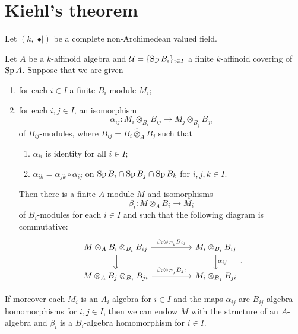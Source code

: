 \section{Kiehl's theorem}
Let $(k,|\bullet|)$ be a complete non-Archimedean valued field.
\begin{thm}\label{thm-Kiehl}
    Let $A$ be a $k$-affinoid algebra and $\mathcal{U}=\{\operatorname{Sp} B_i\}_{i\in I}$ a finite $k$-affinoid covering of $\operatorname{Sp} A$. Suppose that we are given 
    \begin{enumerate}
        \item for each $i\in I$ a finite $B_i$-module $M_i$;
        \item for each $i,j\in I$, an isomorphism 
        \[
            \alpha_{ij}:M_i\otimes_{B_i} B_{ij}\rightarrow M_j\otimes_{B_j} B_{ji}
        \]
        of $B_{ij}$-modules, where $B_{ij}=B_i\hat{\otimes}_A B_j$ such that 
        \begin{enumerate}
            \item $\alpha_{ii}$ is identity for all $i\in I$;
            \item $\alpha_{ik}=\alpha_{jk}\circ \alpha_{ij}$ on $\operatorname{Sp} B_i\cap \operatorname{Sp} B_j\cap \operatorname{Sp} B_k$ for $i,j,k\in I$.
        \end{enumerate}
        Then there is a finite $A$-module $M$ and isomorphisms 
        \[
            \beta_i: M\otimes_{A} B_i\rightarrow M_i  
        \]
        of $B_i$-modules for each $i\in I$ and such that the following diagram is commutative:    
        \[
            \begin{tikzcd}
                M\otimes_A B_i\otimes_{B_i}B_{ij} \arrow[rr, "\beta_i\otimes_{B_i}B_{ij}"] \arrow[d, no head, Rightarrow] &  & M_i\otimes_{B_i}B_{ij} \arrow[d, "\alpha_{ij}"] \\
                M\otimes_A B_j\otimes_{B_j}B_{ji} \arrow[rr, "\beta_i\otimes_{B_j}B_{ji}"]                                &  & M_i\otimes_{B_j}B_{ji}                         
            \end{tikzcd}.  
        \]
\end{enumerate}

    If moreover each $M_i$ is an $A_i$-algebra for $i\in I$ and the maps $\alpha_{ij}$ are $B_{ij}$-algebra homomorphisms for $i,j\in I$, then we can endow $M$ with the structure of an $A$-algebra and $\beta_i$ is a $B_i$-algebra homomorphism for $i\in I$. 
\end{thm}
